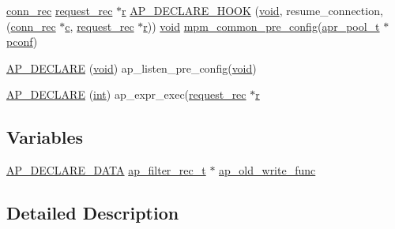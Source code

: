 \begin{DoxyCompactItemize}
\item 
\hyperlink{structconn__rec}{conn\+\_\+rec} \hyperlink{structrequest__rec}{request\+\_\+rec} $\ast$\hyperlink{pcregrep_8txt_a2e9e9438b26c0bb4425367a7e4f75eb3}{r} \hyperlink{group__hooks_ga5f6df4a8753a79fe2b4810497328cbba}{A\+P\+\_\+\+D\+E\+C\+L\+A\+R\+E\+\_\+\+H\+O\+OK} (\hyperlink{group__MOD__ISAPI_gacd6cdbf73df3d9eed42fa493d9b621a6}{void}, resume\+\_\+connection,(\hyperlink{structconn__rec}{conn\+\_\+rec} $\ast$\hyperlink{pcregrep_8txt_aef720ae5f62fa015619d00171d917416}{c}, \hyperlink{structrequest__rec}{request\+\_\+rec} $\ast$\hyperlink{pcregrep_8txt_a2e9e9438b26c0bb4425367a7e4f75eb3}{r})) \hyperlink{group__MOD__ISAPI_gacd6cdbf73df3d9eed42fa493d9b621a6}{void} \hyperlink{mpm__common_8c_a27045f3ef3e9947440547839b21594ed}{mpm\+\_\+common\+\_\+pre\+\_\+config}(\hyperlink{structapr__pool__t}{apr\+\_\+pool\+\_\+t} $\ast$\hyperlink{group__APACHE__CORE__CONFIG_gade454c9a3dc13ac389d15bf30f6c92b2}{pconf})
\item 
\hyperlink{group__hooks_ga2991c49e63464ffbc0a6d82f1878f0cd}{A\+P\+\_\+\+D\+E\+C\+L\+A\+RE} (\hyperlink{group__MOD__ISAPI_gacd6cdbf73df3d9eed42fa493d9b621a6}{void}) ap\+\_\+listen\+\_\+pre\+\_\+config(\hyperlink{group__MOD__ISAPI_gacd6cdbf73df3d9eed42fa493d9b621a6}{void})
\item 
\hyperlink{group__hooks_gaee4b62c3b33a1f9567f36f9fbaaf912a}{A\+P\+\_\+\+D\+E\+C\+L\+A\+RE} (\hyperlink{pcre_8txt_a42dfa4ff673c82d8efe7144098fbc198}{int}) ap\+\_\+expr\+\_\+exec(\hyperlink{structrequest__rec}{request\+\_\+rec} $\ast$\hyperlink{pcregrep_8txt_a2e9e9438b26c0bb4425367a7e4f75eb3}{r}
\end{DoxyCompactItemize}
\subsection*{Variables}
\begin{DoxyCompactItemize}
\item 
\hyperlink{ap__config_8h_a0bb4c3adf74510a0dcdad5b125725fe0}{A\+P\+\_\+\+D\+E\+C\+L\+A\+R\+E\+\_\+\+D\+A\+TA} \hyperlink{structap__filter__rec__t}{ap\+\_\+filter\+\_\+rec\+\_\+t} $\ast$ \hyperlink{group__hooks_ga4808ab9dd70064ff4457755e3f2bd385}{ap\+\_\+old\+\_\+write\+\_\+func}
\end{DoxyCompactItemize}


\subsection{Detailed Description}


